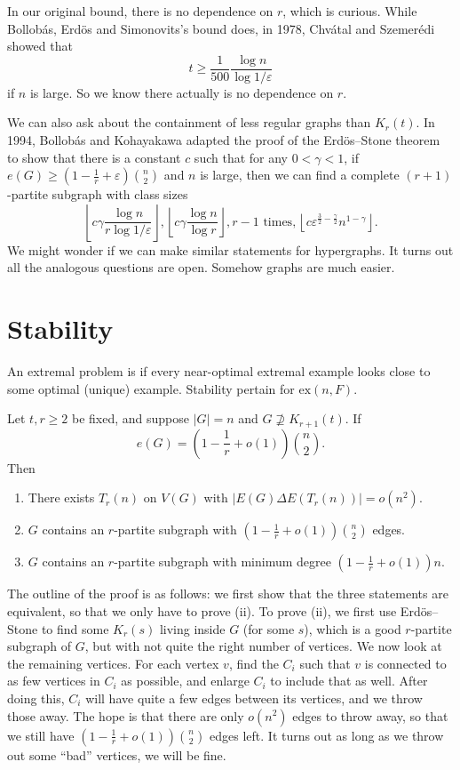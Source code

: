 \documentclass[a4paper]{article}
\renewcommand\ex{\mathrm{ex}}
\begin{document}
In our original bound, there is no dependence on $r$, which is curious. While Bollob\'as, Erd\"os and Simonovits's bound does, in 1978, Chv\'atal and Szemer\'edi showed that
\[
  t \geq \frac{1}{500} \frac{\log n}{\log 1/\varepsilon}
\]
if $n$ is large. So we know there actually is no dependence on $r$.

We can also ask about the containment of less regular graphs than $K_r(t)$. In 1994, Bollob\'as and Kohayakawa adapted the proof of the Erd\"os--Stone theorem to show that there is a constant $c$ such that for any $0 < \gamma < 1$, if $e(G) \geq \left(1 - \frac{1}{r} + \varepsilon\right) \binom{n}{2}$ and $n$ is large, then we can find a complete $(r + 1)$-partite subgraph with class sizes
\[
  \left\lfloor c \gamma \frac{\log n}{r \log 1/\varepsilon}\right\rfloor, \left\lfloor c \gamma \frac{\log n}{\log r}\right\rfloor, r - 1\text{ times}, \left\lfloor c \varepsilon^{\frac{3}{2} - \frac{\gamma}{2}} n^{1 - \gamma}\right\rfloor.
\]
We might wonder if we can make similar statements for hypergraphs. It turns out all the analogous questions are open. Somehow graphs are much easier.

\section{Stability}
An extremal problem is  if every near-optimal extremal example looks close to some optimal (unique) example. Stability pertain for $\ex(n, F)$.

\begin{thm}
  Let $t, r \geq 2$ be fixed, and suppose $|G| = n$ and $G \not\supseteq K_{r + 1}(t)$. If
  \[
    e(G) = \left(1 - \frac{1}{r} + o(1)\right) \binom{n}{2}.
  \]
  Then
  \begin{enumerate}
    \item There exists $T_r(n)$ on $V(G)$ with $|E(G) \Delta E(T_r(n))| = o(n^2)$.
    \item $G$ contains an $r$-partite subgraph with $\left(1 - \frac{1}{r} + o(1)\right) \binom{n}{2}$ edges.
    \item $G$ contains an $r$-partite subgraph with minimum degree $\left(1 - \frac{1}{r} + o(1)\right)n$.
  \end{enumerate}
\end{thm}

The outline of the proof is as follows: we first show that the three statements are equivalent, so that we only have to prove (ii). To prove (ii), we first use Erd\"os--Stone to find some $K_r(s)$ living inside $G$ (for some $s$), which is a good $r$-partite subgraph of $G$, but with not quite the right number of vertices. We now look at the remaining vertices. For each vertex $v$, find the $C_i$ such that $v$ is connected to as few vertices in $C_i$ as possible, and enlarge $C_i$ to include that as well. After doing this, $C_i$ will have quite a few edges between its vertices, and we throw those away. The hope is that there are only $o(n^2)$ edges to throw away, so that we still have $\left(1 - \frac{1}{r} + o(1)\right) \binom{n}{2}$ edges left. It turns out as long as we throw out some ``bad'' vertices, we will be fine.
\end{document}
